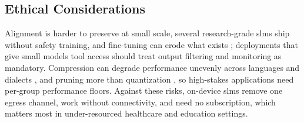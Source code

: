 \subsection{Ethical Considerations}
\label{subsec:discussion_ethics}

Alignment is harder to preserve at small scale, several research-grade \glspl{slm} ship without safety training, and fine-tuning can erode what exists \citep{qi2023finetuning}; deployments that give small models tool access should treat output filtering and monitoring as mandatory. Compression can degrade performance unevenly across languages and dialects \citep{blodgett2020language}, and pruning more than quantization \citep{kurz2025pruning_vs_quant}, so high-stakes applications need per-group performance floors. Against these risks, on-device \glspl{slm} remove one egress channel, work without connectivity, and need no subscription, which matters most in under-resourced healthcare and education settings.
